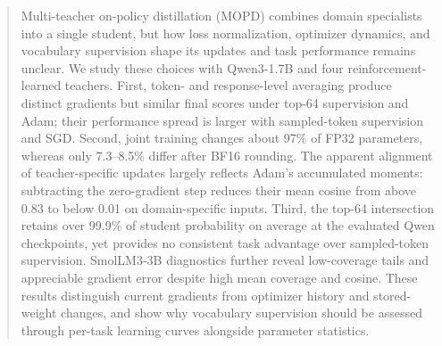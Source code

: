 \begin{abstract}
Multi-teacher on-policy distillation (MOPD) combines domain specialists into a single student, but how loss normalization, optimizer dynamics, and vocabulary supervision shape its updates and task performance remains unclear. We study these choices with Qwen3-1.7B and four reinforcement-learned teachers. First, token- and response-level averaging produce distinct gradients but similar final scores under top-64 supervision and Adam; their performance spread is larger with sampled-token supervision and SGD. Second, joint training changes about 97\% of FP32 parameters, whereas only 7.3--8.5\% differ after BF16 rounding. The apparent alignment of teacher-specific updates largely reflects Adam's accumulated moments: subtracting the zero-gradient step reduces their mean cosine from above 0.83 to below 0.01 on domain-specific inputs. Third, the top-64 intersection retains over 99.9\% of student probability on average at the evaluated Qwen checkpoints, yet provides no consistent task advantage over sampled-token supervision. SmolLM3-3B diagnostics further reveal low-coverage tails and appreciable gradient error despite high mean coverage and cosine. These results distinguish current gradients from optimizer history and stored-weight changes, and show why vocabulary supervision should be assessed through per-task learning curves alongside parameter statistics.
\end{abstract}
